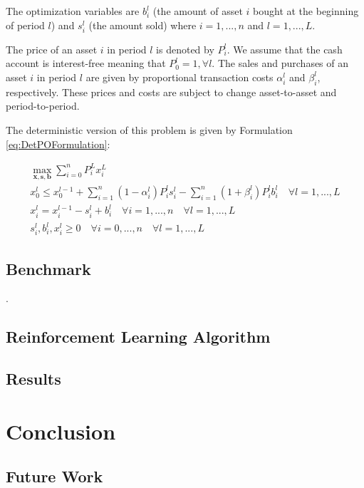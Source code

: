 \documentclass[12pt]{article}
\begin{document}
The optimization variables are $b_i^l$ (the amount of asset $i$ bought at the beginning of period $l$) and $s_i^l$ (the amount sold) where $i=1,...,n$ and $l=1,...,L$. 

The price of an asset $i$ in period $l$ is denoted by $P_i^l$. We assume that the cash account is interest-free meaning that $P_0^l = 1, \forall l$. The sales and purchases of an asset $i$ in period $l$ are given by proportional transaction costs $\alpha_i^l$ and $\beta_i^l$, respectively. These prices and costs are subject to change asset-to-asset and period-to-period. 

The deterministic version of this problem is given by Formulation \ref{eq:DetPOFormulation}: 

\begin{subequations}\label{eq:DetPOFormulation}
\begin{align}
    \max_{\mathbf{x},\mathbf{s},\mathbf{b}} \sum_{i=0}^n P_i^L x_i^L \label{eq:POobj} \\
    x_0^l \leq x_0^{l-1} + \sum_{i=1}^n (1-\alpha_i^l) P_i^l s_i^l - \sum_{i=1}^n (1+\beta_i^l) P_i^l b_i^l \quad \forall l = 1,...,L \label{eq:PObal} \\
    x_i^l = x_i^{l-1} - s_i^l + b_i^l \quad \forall i = 1,...,n \quad \forall l = 1,...,L \label{eq:POsum}\\
    s_i^l, b_i^l, x_i^l \geq 0 \quad \forall i = 0,...,n \quad \forall l = 1, ..., L\label{eq:POnonneg}
\end{align}
\end{subequations}
\subsection{Benchmark}
\cite{Ben-Tal2000}. 
\subsection{Reinforcement Learning Algorithm}

\subsection{Results}

\section{Conclusion}

\subsection{Future Work}

\newpage


\end{document}
